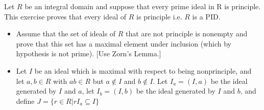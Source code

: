 \documentclass[10pt]{article}
\newenvironment{problem}[2][Problem]{\begin{trivlist}
		\item[\hskip \labelsep {\bfseries #1}\hskip \labelsep {\bfseries #2.}]}{\end{trivlist}}
\begin{document}
	\begin{problem}{2.6}
		Let $R$ be an integral domain and suppose that every prime ideal in R is principle. This exercise proves that every ideal of $R$ is principle i.e. $R$ is a PID.
		\begin{itemize}
			\item[(a)] Assume that the set of ideals of $R$ that are not principle is nonempty and prove that this set has a maximal element under inclusion (which by hypothesis is not prime). [Use Zorn's Lemma.]
			\item[(b)] Let $I$ be an ideal which is maximal with respect to being nonprinciple, and let $a,b \in R$ with $ab \in R$ but $a \notin I$ and $b \notin I$. Let $I_{a} = (I, a)$ be the ideal generated by $I$ and $a$, let $I_{b}=(I, b)$ be the ideal generated by $I$ and $b$, and define $J=\{ r \in R | r I_{a} \subseteq I\}$
		\end{itemize}
		
	\end{problem}
		
		
		
\end{document}
